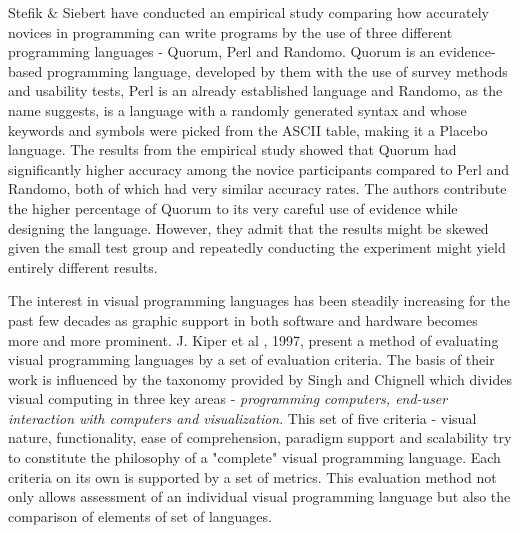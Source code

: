 Stefik \& Siebert \cite{QuorumRandomo} have conducted an empirical study comparing how accurately novices in programming can write programs by the use of three different programming languages - Quorum, Perl and Randomo. Quorum is an evidence-based programming language, developed by them with the use of survey methods and usability tests, Perl is an already established language and Randomo, as the name suggests, is a language with a randomly generated syntax and whose keywords and symbols were picked from the ASCII table, making it a Placebo language. The results from the empirical study showed that Quorum had significantly higher accuracy among the novice participants compared to Perl and Randomo, both of which had very similar accuracy rates. The authors contribute the higher percentage of Quorum to its very careful use of evidence while designing the language. However, they admit that the results might be skewed given the small test group and repeatedly conducting the experiment might yield entirely different results.

The interest in visual programming languages has been steadily increasing for the past few decades as graphic support in both software and hardware becomes more and more prominent. J. Kiper et al \cite{VisualLangsEval}, 1997, present a method of evaluating visual programming languages by a set of evaluation criteria. The basis of their work is influenced by the taxonomy provided by Singh and Chignell \cite{VisualComputer} which divides visual computing in three key areas - \textit{programming computers, end-user interaction with computers and visualization}. This set of five criteria - visual nature, functionality, ease of comprehension, paradigm support and scalability try to constitute the philosophy of a "complete" visual programming language. Each criteria on its own is supported by a set of metrics. This evaluation method not only allows assessment of an individual visual programming language but also the comparison of elements of set of languages.




   